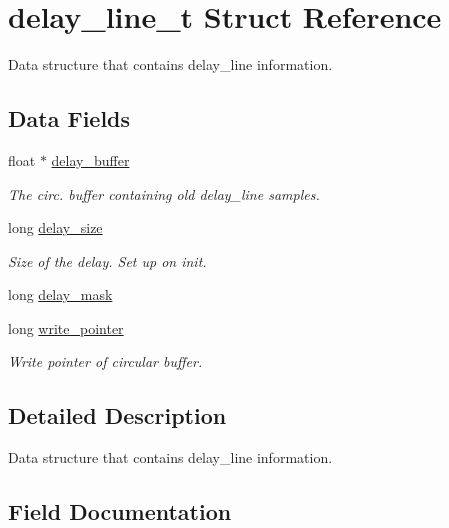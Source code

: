 \hypertarget{structdelay__line__t}{}\section{delay\+\_\+line\+\_\+t Struct Reference}
\label{structdelay__line__t}


Data structure that contains delay\+\_\+line information.  


\subsection*{Data Fields}
\begin{DoxyCompactItemize}
\item 
float $\ast$ \mbox{\hyperlink{structdelay__line__t_ab306b10f6d4ba74e6283ff0f3f75d3de}{delay\+\_\+buffer}}
\begin{DoxyCompactList}\small\item\em The circ. buffer containing old delay\+\_\+line samples. \end{DoxyCompactList}\item 
long \mbox{\hyperlink{structdelay__line__t_a37c6b3ad5d2d500817bf4bb3eb2f6f8d}{delay\+\_\+size}}
\begin{DoxyCompactList}\small\item\em Size of the delay. Set up on init. \end{DoxyCompactList}\item 
long \mbox{\hyperlink{structdelay__line__t_adf31bf9bd65edf272a237fc3fe5da4a0}{delay\+\_\+mask}}
\item 
long \mbox{\hyperlink{structdelay__line__t_a703f4e6cacaf50647c3b82ebe5c9c349}{write\+\_\+pointer}}
\begin{DoxyCompactList}\small\item\em Write pointer of circular buffer. \end{DoxyCompactList}\end{DoxyCompactItemize}


\subsection{Detailed Description}
Data structure that contains delay\+\_\+line information. 

\subsection{Field Documentation}
\mbox{\label{structdelay__line__t_ab306b10f6d4ba74e6283ff0f3f75d3de}} 
